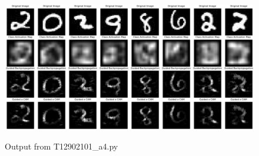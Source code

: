 \documentclass[12pt]{article}
\begin{document}
\begin{figure}[h]
\centering
\includegraphics[width=1\linewidth]{../output.png}
\label{fig:output}
\caption{Output from T12902101\_a4.py}
\end{figure}
\end{document}
